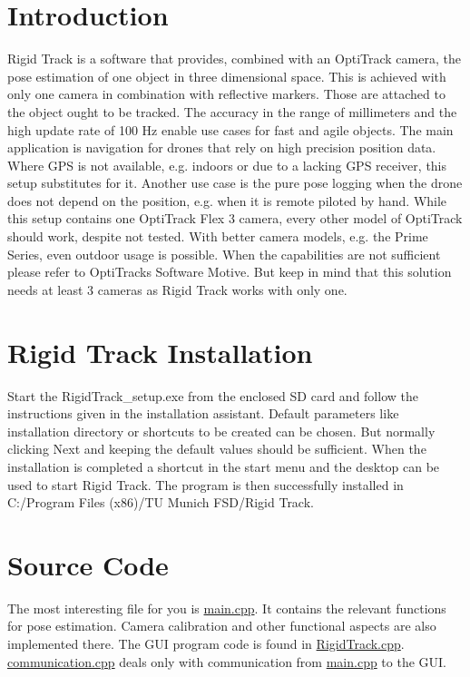 \hypertarget{index_intro_sec}{}\section{Introduction}\label{index_intro_sec}
Rigid Track is a software that provides, combined with an Opti\+Track camera, the pose estimation of one object in three dimensional space. This is achieved with only one camera in combination with reflective markers. Those are attached to the object ought to be tracked. The accuracy in the range of millimeters and the high update rate of 100 Hz enable use cases for fast and agile objects. The main application is navigation for drones that rely on high precision position data. Where G\+PS is not available, e.\+g. indoors or due to a lacking G\+PS receiver, this setup substitutes for it. Another use case is the pure pose logging when the drone does not depend on the position, e.\+g. when it is remote piloted by hand. While this setup contains one Opti\+Track Flex 3 camera, every other model of Opti\+Track should work, despite not tested. With better camera models, e.\+g. the Prime Series, even outdoor usage is possible. When the capabilities are not sufficient please refer to Opti\+Tracks Software Motive. But keep in mind that this solution needs at least 3 cameras as Rigid Track works with only one.\hypertarget{index_softInstall_sec}{}\section{Rigid Track Installation}\label{index_softInstall_sec}
Start the Rigid\+Track\+\_\+setup.\+exe from the enclosed SD card and follow the instructions given in the installation assistant. Default parameters like installation directory or shortcuts to be created can be chosen. But normally clicking Next and keeping the default values should be sufficient. When the installation is completed a shortcut in the start menu and the desktop can be used to start Rigid Track. The program is then successfully installed in C\+:/\+Program Files (x86)/\+TU Munich F\+S\+D/\+Rigid Track.\hypertarget{index_source_code}{}\section{Source Code}\label{index_source_code}
The most interesting file for you is \hyperlink{main_8cpp}{main.\+cpp}. It contains the relevant functions for pose estimation. Camera calibration and other functional aspects are also implemented there. The G\+UI program code is found in \hyperlink{_rigid_track_8cpp}{Rigid\+Track.\+cpp}. \hyperlink{communication_8cpp_source}{communication.\+cpp} deals only with communication from \hyperlink{main_8cpp}{main.\+cpp} to the G\+UI. 